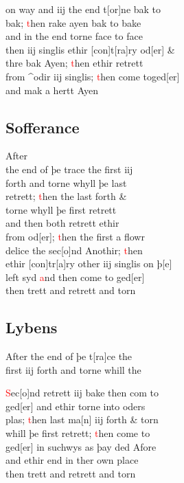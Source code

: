 \documentclass[12pt,letter]{article} %
\newcommand{\red}[1]{\textcolor{red}{#1}}
\newcommand{\srcpg}[1]{
    \noindent{
        \color{Gray}{\rule[0.5ex]{\linewidth}{1pt}~#1} 
    
    }
}
\begin{document}
on way and iij the end t{[}or{]}ne bak to\\
bak; \red{t}hen rake ayen bak to bake\\
and in the end torne face to face\\
then iij singlis ethir {[}con{]}t{[}ra{]}ry od{[}er{]} \&\\
thre bak Ayen; \red{t}hen ethir retrett\\
from \^{}odir iij singlis; \red{t}hen come toged{[}er{]}\\
and mak a hertt Ayen

\subsection{Sofferance}
After\\
the end of þe trace the first iij\\
forth and torne whyll þe last \\
retrett; \red{t}hen the last forth \&\\ 
torne whyll þe first retrett\\
and then both retrett ethir\\
from od{[}er{]}; \red{t}hen the first a flowr\\
delice the sec{[}o{]}nd Anothir; \red{t}hen\\
ethir {[}con{]}tr{[}a{]}ry other iij singlis on þ{[}e{]}\\
left syd \red{a}nd then come to ged{[}er{]}\\
then trett and retrett and torn

\subsection{Lybens}
After the end of þe t{[}ra{]}ce the\\
first iij forth and torne whill the
\srcpg{64}
\red{S}ec{[}o{]}nd retrett iij bake then com to\\
ged{[}er{]} and ethir torne into oders\\
plas; \red{t}hen last ma{[}n{]} iij forth \& torn\\
whill þe first retrett; \red{t}hen come to\\
ged{[}er{]} in suchwys as þay ded Afore\\
and ethir end in ther own place\\
then trett and retrett and torn
\end{document}
